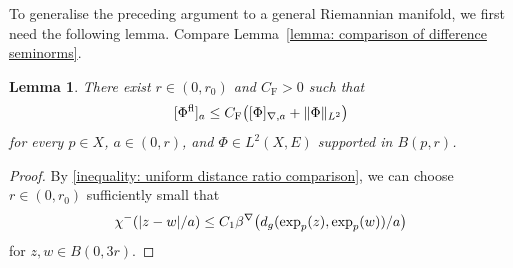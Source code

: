 \documentclass[a4paper,oneside,12pt]{amsart}
\theoremstyle{plain}
\newtheorem{lemma}[theorem]{Lemma}
\theoremstyle{definition}
\theoremstyle{remark}
\DeclarePairedDelimiter{\abs}{\lvert}{\rvert}
\DeclarePairedDelimiter{\norm}{\lVert}{\rVert}
\DeclarePairedDelimiter{\seminorm}{\lbrack}{\rbrack}
\newcommand{\Ltwonorm}[2][L^2]{\norm{#2}_{#1}}
\newcommand{\mesoscopicseminorm}[2][a]{\seminorm{#2}_{#1}}
\newcommand{\mesoscopicdifferenceseminorm}[2][a]{\seminorm{#2}_{\nabla,#1}}
\newcommand{\cutoff}{\beta}
\newcommand{\cutoffnabla}{\cutoff^{\nabla}}
\newcommand{\cutofflower}{\chi^-}
\newcommand{\flatmodel}[1]{#1^{\mathrm{fl}}}
\newcommand{\constantcomparison}{C_{\mathrm{F}}}
\begin{document}
To generalise the preceding argument to a general Riemannian manifold, we first need the following lemma.
Compare Lemma~\ref{lemma: comparison of difference seminorms}.
\begin{lemma}\label{lemma: another comparison of difference seminorms}
  There exist $r \in (0,r_0)$ and $\constantcomparison > 0$ such that
  \begin{equation}
    \mesoscopicseminorm{\flatmodel{\Phi}} \le \constantcomparison \bigl(\mesoscopicdifferenceseminorm{\Phi} + \Ltwonorm{\Phi} \bigr)
  \end{equation}
  for every $p \in X$, $a \in (0,r)$, and $\Phi \in L^2(X,E)$ supported in $B(p,r)$.
\end{lemma}
\begin{proof}
  By \eqref{inequality: uniform distance ratio comparison}, we can choose $r \in (0,r_0)$ sufficiently small that
  \begin{equation}\label{inequality: cutofflower and cutoffnabla comparison}
    \cutofflower(\abs{z-w}/a) \le C_1 \cutoffnabla \bigl( d_g(\exp_p(z),\exp_p(w))/a \bigr)
  \end{equation}
  for $z,w \in B(0,3r)$.


\end{proof}
\end{document}
